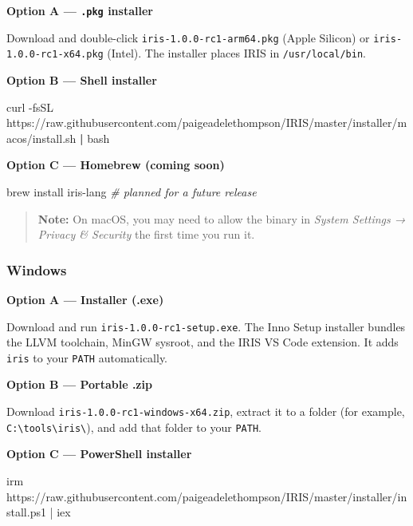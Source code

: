 \documentclass[
  english,
]{book}
\newenvironment{Shaded}{\begin{snugshade}}{\end{snugshade}}
\newcommand{\AttributeTok}[1]{\textcolor[rgb]{0.83,0.83,0.83}{#1}}
\newcommand{\CommentTok}[1]{\textcolor[rgb]{0.42,0.60,0.33}{\textit{#1}}}
\newcommand{\ExtensionTok}[1]{\textcolor[rgb]{0.83,0.83,0.83}{#1}}
\newcommand{\FunctionTok}[1]{\textcolor[rgb]{0.86,0.86,0.67}{#1}}
\newcommand{\KeywordTok}[1]{\textcolor[rgb]{0.34,0.61,0.84}{\textbf{#1}}}
\newcommand{\NormalTok}[1]{\textcolor[rgb]{0.83,0.83,0.83}{#1}}
\newcommand{\OperatorTok}[1]{\textcolor[rgb]{0.83,0.83,0.83}{#1}}
\begin{document}
\textbf{Option A --- \texttt{.pkg} installer}

Download and double-click \texttt{iris-1.0.0-rc1-arm64.pkg} (Apple
Silicon) or \texttt{iris-1.0.0-rc1-x64.pkg} (Intel). The installer
places IRIS in \texttt{/usr/local/bin}.

\textbf{Option B --- Shell installer}

\begin{Shaded}
\begin{Highlighting}[]
\ExtensionTok{curl} \AttributeTok{{-}fsSL}\NormalTok{ https://raw.githubusercontent.com/paigeadelethompson/IRIS/master/installer/macos/install.sh }\KeywordTok{|} \FunctionTok{bash}
\end{Highlighting}
\end{Shaded}

\textbf{Option C --- Homebrew (coming soon)}

\begin{Shaded}
\begin{Highlighting}[]
\ExtensionTok{brew}\NormalTok{ install iris{-}lang   }\CommentTok{\# planned for a future release}
\end{Highlighting}
\end{Shaded}

\begin{quote}
\textbf{Note:} On macOS, you may need to allow the binary in
\emph{System Settings → Privacy \& Security} the first time you run it.
\end{quote}

\subsubsection{Windows}\label{windows}

\textbf{Option A --- Installer (.exe)}

Download and run \texttt{iris-1.0.0-rc1-setup.exe}. The Inno Setup
installer bundles the LLVM toolchain, MinGW sysroot, and the IRIS VS
Code extension. It adds \texttt{iris} to your \texttt{PATH}
automatically.

\textbf{Option B --- Portable .zip}

Download \texttt{iris-1.0.0-rc1-windows-x64.zip}, extract it to a folder
(for example,
\texttt{C:\textbackslash{}tools\textbackslash{}iris\textbackslash{}}),
and add that folder to your \texttt{PATH}.

\textbf{Option C --- PowerShell installer}

\begin{Shaded}
\begin{Highlighting}[]
\FunctionTok{irm}\NormalTok{ https}\OperatorTok{://}\NormalTok{raw}\OperatorTok{.}\FunctionTok{githubusercontent}\OperatorTok{.}\FunctionTok{com}\OperatorTok{/}\NormalTok{paigeadelethompson}\OperatorTok{/}\NormalTok{IRIS}\OperatorTok{/}\NormalTok{master}\OperatorTok{/}\NormalTok{installer}\OperatorTok{/}\NormalTok{install}\OperatorTok{.}\FunctionTok{ps1} \OperatorTok{|} \FunctionTok{iex}
\end{Highlighting}
\end{Shaded}
\end{document}
